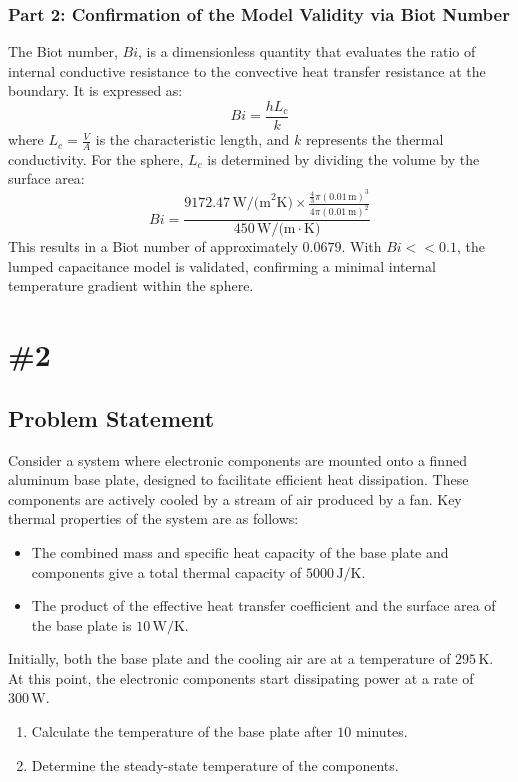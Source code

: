 \documentclass{article}
\numberwithin{equation}{section}
\begin{document}
\subsubsection*{Part 2: Confirmation of the Model Validity via Biot Number}
The Biot number, $Bi$, is a dimensionless quantity that evaluates the ratio of internal conductive resistance to the convective heat transfer resistance at the boundary. It is expressed as:
\begin{equation}
    Bi = \frac{hL_c}{k}
\end{equation}
where $L_c = \frac{V}{A}$ is the characteristic length, and $k$ represents the thermal conductivity. For the sphere, $L_c$ is determined by dividing the volume by the surface area:
\begin{equation}
    Bi = \frac{9172.47 \, \text{W/(m}^2\text{K)} \times \frac{\frac{4}{3}\pi (0.01 \, \text{m})^3}{4\pi (0.01 \, \text{m})^2}}{450 \, \text{W/(m} \cdot \text{K)}}
\end{equation}
This results in a Biot number of approximately $0.0679$. With $Bi << 0.1$, the lumped capacitance model is validated, confirming a minimal internal temperature gradient within the sphere.


\newpage
\section{\#2}
\subsection*{Problem Statement}

Consider a system where electronic components are mounted onto a finned aluminum base plate, designed to facilitate efficient heat dissipation. These components are actively cooled by a stream of air produced by a fan. Key thermal properties of the system are as follows:
\begin{itemize}
    \item The combined mass and specific heat capacity of the base plate and components give a total thermal capacity of \(5000 \, \text{J/K}\).
    \item The product of the effective heat transfer coefficient and the surface area of the base plate is \(10 \, \text{W/K}\).
\end{itemize}

Initially, both the base plate and the cooling air are at a temperature of \(295 \, \text{K}\). At this point, the electronic components start dissipating power at a rate of \(300 \, \text{W}\).
\begin{enumerate}
    \item Calculate the temperature of the base plate after \(10\) minutes.
    \item Determine the steady-state temperature of the components.
\end{enumerate}
\end{document}
